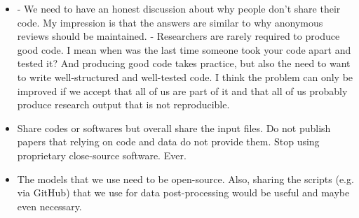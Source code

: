 \documentclass{article}
\begin{document}
\begin{itemize}
	\item - We need to have an honest discussion about why people don't share their code. My impression is that the answers are similar to why anonymous reviews should be maintained.  
- Researchers are rarely required to produce good code. I mean when was the last time someone took your code apart and tested it? And producing good code takes practice, but also the need to want to write well-structured and well-tested code. I think the problem can only be improved if we accept that all of us are part of it and that all of us probably produce research output that is not reproducible.
	\item Share codes or softwares but overall share the input files. Do not publish papers that relying on code and data do not provide them. Stop using proprietary close-source software. Ever.
	\item The models that we use need to be open-source. Also, sharing the scripts (e.g. via GitHub) that we use for data post-processing would be useful and maybe even necessary.
\end{itemize}
\end{document}
